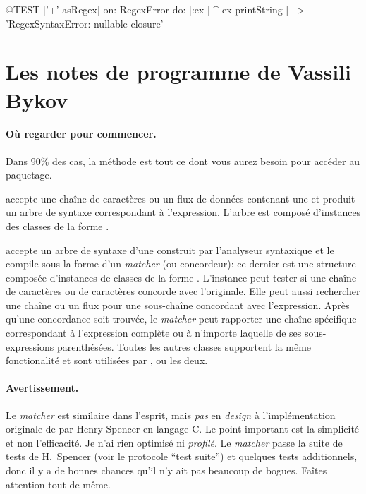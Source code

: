 \documentclass[a4paper,10pt,twoside]{book}
\begin{document}

\begin{code}{@TEST}
['+' asRegex] on: RegexError do: [:ex | ^ ex printString ]                                        --> 'RegexSyntaxError:  nullable closure'
\end{code}
\section{Les notes de programme de Vassili Bykov}

\paragraph{Où regarder pour commencer.}
Dans 90\% des cas, la méthode  est tout
ce dont vous aurez besoin pour accéder au paquetage.

 accepte une chaîne de caractères ou un flux de
données contenant une \expreg et produit un arbre de syntaxe
correspondant à l'expression. L'arbre est composé d'instances des
classes de la forme .

 accepte un arbre de syntaxe d'une \expreg construit
par l'analyseur syntaxique et le compile sous la forme d'un
\emph{matcher} (ou concordeur): ce dernier est une structure composée
d'instances de classes de la forme . 
L'instance  peut tester si une chaîne de caractères
ou  %
de caractères concorde avec l'\expreg originale. Elle peut aussi
rechercher une chaîne ou un flux pour une sous-chaîne concordant avec
l'expression. Après qu'une concordance soit trouvée, le \emph{matcher}
peut rapporter une chaîne spécifique correspondant à l'expression
complète ou à n'importe laquelle de ses sous-expressions parenthésées.
Toutes les autres classes supportent la même fonctionalité et sont
utilisées par ,  ou les deux.

\paragraph{Avertissement.} Le \emph{matcher} est similaire dans
l'esprit, mais \emph{pas} en \emph{design}
à l'implémentation originale de \expreg par Henry Spencer en langage
C. Le point important est la simplicité et non l'efficacité. Je n'ai
rien optimisé ni \emph{profilé}.
Le \emph{matcher} passe la suite de tests de H.~Spencer (voir le
protocole ``test suite'') et quelques tests additionnels, donc il y a
de bonnes chances qu'il n'y ait pas beaucoup de bogues. Faîtes
attention tout de même. 
\end{document}
